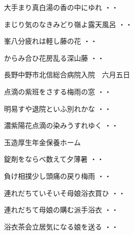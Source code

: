 \vspace{0.6cm}
\begin{shiika}大手まり真白湯の香の中にゆれ
\hfill{・・}\end{shiika}
\vspace{0.6cm}
\begin{shiika}まじり気のなきみどり嶺よ露天風呂
\hfill{・・}\end{shiika}
\vspace{0.6cm}
\begin{shiika}峯八分疲れは軽し藤の花
\hfill{・・}\end{shiika}
\vspace{0.6cm}
\begin{shiika}からみ合ひ花房乱る深山藤
\hfill{・・}\end{shiika}
\vspace{0.6cm}
長野中野市北信総合病院入院　六月五日
\begin{shiika}点滴の紫班をさする梅雨の窓
\hfill{・・}\end{shiika}
\begin{shiika}明易すや退院といふ別れかな
\hfill{・・}\end{shiika}
\begin{shiika}濃紫陽花点滴の染みうすれゆく
\hfill{・・}\end{shiika}
\vspace{0.6cm}
玉造厚生年金保養ホーム
\begin{shiika}錠剤をならべ数えて夕薄暑
\hfill{・・}\end{shiika}
\begin{shiika}負け相撲少し頭痛の戻り梅雨
\hfill{・・}\end{shiika}
\vspace{0.6cm}
\begin{shiika}連れだちていそいそ母娘浴衣買ひ
\hfill{・・}\end{shiika}
\vspace{0.6cm}
\begin{shiika}連れだちて母娘の購む派手浴衣
\hfill{・・}\end{shiika}
\vspace{0.6cm}
\begin{shiika}浴衣茶会立居気になる娘を送る
\hfill{・・}\end{shiika}
